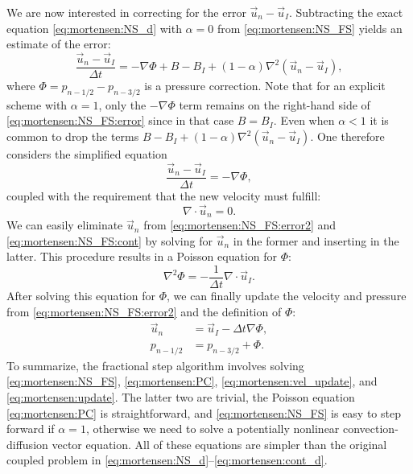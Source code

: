 We are now interested in correcting for the error $\vec{u}_n-\vec{u}_I$.
Subtracting the exact equation \eqref{eq:mortensen:NS_d} with $\alpha =
0$ from \eqref{eq:mortensen:NS_FS} yields an estimate of the error:
\begin{equation}
\label{eq:mortensen:NS_FS:error}
\frac{{\vec{u}}_{n}-\vec{u}_{I}}{\Delta t} =
-\nabla\Phi + B - B_I + (1-\alpha )\nabla^2(\vec{u}_n-\vec{u}_I),
\end{equation}
where $\Phi = p_{n-1/2} - p_{n-3/2} $ is a pressure correction.  Note that
for an explicit scheme with $\alpha = 1$, only the $-\nabla\Phi$ term
remains on the right-hand side of \eqref{eq:mortensen:NS_FS:error}
since in that case $B = B_I$. Even when $\alpha < 1$ it is common to
drop the terms $B - B_I + (1 - \alpha)\nabla^2(\vec{u}_n-\vec{u}_I)$.
One therefore considers the simplified equation
\begin{equation}
\label{eq:mortensen:NS_FS:error2}
\frac{{\vec{u}}_{n}-\vec{u}_{I}}{\Delta t} =
-\nabla\Phi,
\end{equation}
coupled with the requirement that the new velocity must fulfill:
\begin{equation}
 \label{eq:mortensen:NS_FS:cont} \nabla \cdot \vec{u}_{n} =0.
\end{equation}
We can easily eliminate $\vec{u}_{n}$ from
\eqref{eq:mortensen:NS_FS:error2} and
\eqref{eq:mortensen:NS_FS:cont} by solving for $\vec{u}_{n}$ in the
former and inserting in the latter. This procedure results in a
Poisson equation for $\Phi$:
\begin{equation}
 \label{eq:mortensen:PC} \nabla^2 \Phi = -\frac{1}{\Delta t} \nabla \cdot {\vec{u}}_{I} .
\end{equation}
After solving this equation for $\Phi$, we can finally update the
velocity and pressure from \eqref{eq:mortensen:NS_FS:error2} and the
definition of $\Phi$:
\begin{align}
 \label{eq:mortensen:vel_update} \vec{u}_{n} &= {\vec{u}}_{I} - \Delta t \nabla \Phi, \\
  p_{n-1/2} &= p_{n-3/2} + \Phi .
\label{eq:mortensen:update}
\end{align}
To summarize, the fractional step algorithm involves
solving \eqref{eq:mortensen:NS_FS}, \eqref{eq:mortensen:PC},
\eqref{eq:mortensen:vel_update}, and \eqref{eq:mortensen:update}. The
latter two are trivial, the Poisson equation \eqref{eq:mortensen:PC}
is straightforward, and \eqref{eq:mortensen:NS_FS} is easy to step
forward if $\alpha=1$, otherwise we need to solve a potentially
nonlinear convection-diffusion vector equation.  All of these
equations are simpler than the original coupled problem in
\eqref{eq:mortensen:NS_d}--\eqref{eq:mortensen:cont_d}.

